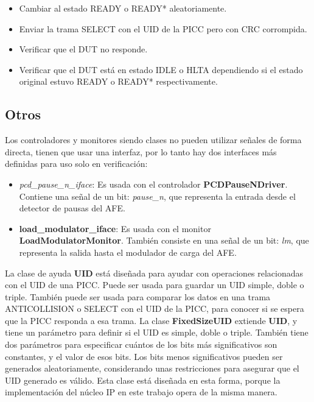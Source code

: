 \documentclass[a4paper, twoside, 11pt]{report}
\begin{document}
\begin{itemize}
  \item Cambiar al estado READY o READY* aleatoriamente.
  \item Enviar la trama SELECT con el UID de la PICC pero con CRC corrompida.
  \item Verificar que el DUT no responde.
  \item Verificar que el DUT está en estado IDLE o HLTA dependiendo si el estado original estuvo READY o READY* respectivamente.
\end{itemize}

\FloatBarrier
\subsection{Otros}

Los controladores y monitores siendo clases no pueden utilizar señales de forma directa, tienen que usar una interfaz, por lo tanto hay dos interfaces más definidas para uso solo en verificación:

\begin{itemize}
  \item \textit{pcd\_pause\_n\_iface}: Es usada con el controlador \textbf{PCDPauseNDriver}. Contiene una señal de un bit: \textit{pause\_n}, que representa la entrada desde el detector de pausas del AFE.
  \item \textbf{load\_modulator\_iface}: Es usada con el monitor \textbf{LoadModulatorMonitor}. También consiste en una señal de un bit: \textit{lm}, que representa la salida hasta el modulador de carga del AFE.
\end{itemize}

La clase de ayuda \textbf{UID} está diseñada para ayudar con operaciones relacionadas con el UID de una PICC. Puede ser usada para guardar un UID simple, doble o triple. También puede ser usada para comparar los datos en una trama ANTICOLLISION o SELECT con el UID de la PICC, para conocer si se espera que la PICC responda a esa trama. La clase \textbf{FixedSizeUID} extiende \textbf{UID}, y tiene un parámetro para definir si el UID es simple, doble o triple. También tiene dos parámetros para especificar cuántos de los bits más significativos son constantes, y el valor de esos bits. Los bits menos significativos pueden ser generados aleatoriamente, considerando unas restricciones para asegurar que el UID generado es válido. Esta clase está diseñada en esta forma, porque la implementación del núcleo IP en este trabajo opera de la misma manera.
\end{document}
